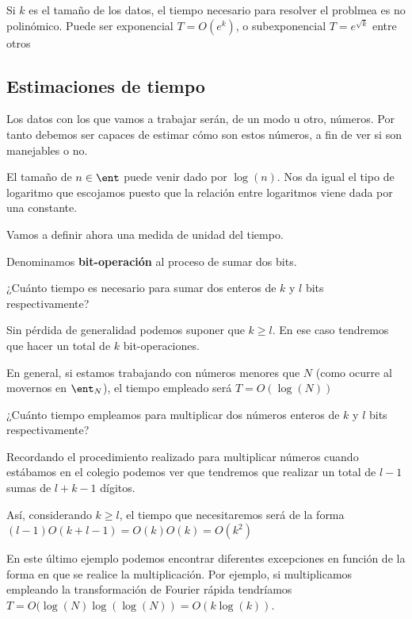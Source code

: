 \begin{defn}[Difícil]
Si $k$ es el tamaño de los datos, el tiempo necesario para resolver el problmea es no polinómico. Puede ser exponencial $T=O(e^k)$, o subexponencial $T=e^{\sqrt{k}}$ entre otros
\end{defn}

\subsection{Estimaciones de tiempo}

Los datos con los que vamos a trabajar serán, de un modo u otro, números. Por tanto debemos ser capaces de estimar cómo son estos números, a fin de ver si son manejables o no.

El tamaño de $n \in \ent$ puede venir dado por $\log(n)$. Nos da igual el tipo de logaritmo que escojamos puesto que la relación entre logaritmos viene dada por una constante.

Vamos a definir ahora una medida de unidad del tiempo.

\begin{defn}
Denominamos \textbf{bit-operación} al proceso de sumar dos bits.
\end{defn}

\begin{example}
¿Cuánto tiempo es necesario para sumar dos enteros de $k$ y $l$ bits respectivamente?

Sin pérdida de generalidad podemos suponer que $k\geq l$. En ese caso tendremos que hacer un total de $k$ bit-operaciones.

En general, si estamos trabajando con números menores que $N$ (como ocurre al movernos en $\ent_N$), el tiempo empleado será $T= O (\log(N))$
\end{example}

\begin{example}
¿Cuánto tiempo empleamos para multiplicar dos números enteros de $k$ y $l$ bits respectivamente?

Recordando el procedimiento realizado para multiplicar números cuando estábamos en el colegio podemos ver que tendremos que realizar un total de $l-1$ sumas de $l+k-1$ dígitos.

Así, considerando $k \geq l$, el tiempo que necesitaremos será de la forma $(l-1)O(k+l-1) = O(k)O(k)=O(k^2)$

\end{example}

En este último ejemplo podemos encontrar diferentes excepciones en función de la forma en que se realice la multiplicación. Por ejemplo, si multiplicamos empleando la transformación de Fourier rápida tendríamos $T=O(\log(N) \log(\log(N)) = O(k \log ( k ))$.

